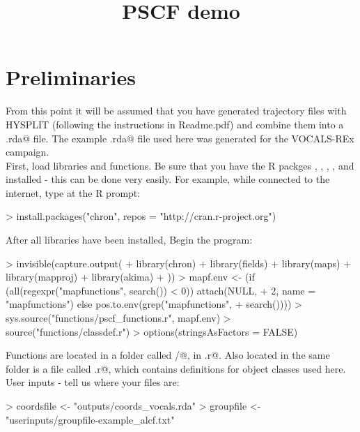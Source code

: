\documentclass{article}
\title{PSCF demo}
\date{}
\renewenvironment{Schunk}{\vspace{\topsep}}{\vspace{\topsep}}
\begin{document}
\maketitle
\hrulefill
\tableofcontents
\hrulefill

\section{Preliminaries}

From this point it will be assumed that you have generated trajectory
files with HYSPLIT (following the instructions in Readme.pdf) and
combine them into a \verb@coords.rda@ file. The example
\verb@coords.rda@ file used here was generated for the VOCALS-REx campaign.\\

First, load libraries and functions. Be sure that you have the R
packges \verb@chron@, \verb@fields@, \verb@maps@, \verb@mapproj@, and
\verb@akima@ installed - this can be done very easily. For example,
while connected to the internet, type at the R prompt:

\begin{Schunk}
\begin{Sinput}
> install.packages("chron", repos = "http://cran.r-project.org")
\end{Sinput}
\end{Schunk}

After all libraries have been installed, Begin the program:
\begin{Schunk}
\begin{Sinput}
> invisible(capture.output({
+     library(chron)
+     library(fields)
+     library(maps)
+     library(mapproj)
+     library(akima)
+ }))
> mapf.env <- (if (all(regexpr("mapfunctions", search()) < 0)) attach(NULL, 
+     2, name = "mapfunctions") else pos.to.env(grep("mapfunctions", 
+     search())))
> sys.source("functions/pscf_functions.r", mapf.env)
> source("functions/classdef.r")
> options(stringsAsFactors = FALSE)
\end{Sinput}
\end{Schunk}

Functions are located in a folder called \verb@functions/@, in
\verb@functions.r@. Also located in the same folder is a file called
\verb@classdef.r@, which contains definitions for object classes used here.\\

\smallskip
User inputs - tell us where your files are:

\begin{Schunk}
\begin{Sinput}
> coordsfile <- "outputs/coords_vocals.rda"
> groupfile <- "userinputs/groupfile-example_alcf.txt"
\end{Sinput}
\end{Schunk}
\end{document}
